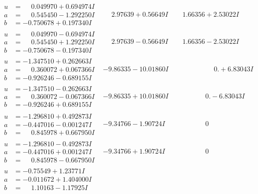 \documentclass[1p]{elsarticle_modified}
\theoremstyle{definition}
\begin{document}
$$\begin{array}{c|c|c}
\begin{aligned}
u &= \phantom{-}0.049970 + 0.694974 I \\
a &= \phantom{-}0.545450 - 1.292250 I \\
b &= -0.750678 + 0.197340 I\end{aligned}
 & \phantom{-}2.97639 + 0.56649 I & \phantom{-}1.66356 + 2.53022 I \\ \hline\begin{aligned}
u &= \phantom{-}0.049970 - 0.694974 I \\
a &= \phantom{-}0.545450 + 1.292250 I \\
b &= -0.750678 - 0.197340 I\end{aligned}
 & \phantom{-}2.97639 - 0.56649 I & \phantom{-}1.66356 - 2.53022 I \\ \hline\begin{aligned}
u &= -1.347510 + 0.262663 I \\
a &= \phantom{-}0.360072 + 0.067366 I \\
b &= -0.926246 - 0.689155 I\end{aligned}
 & -9.86335 - 10.01860 I & \phantom{-0.000000 -}0. + 6.83043 I \\ \hline\begin{aligned}
u &= -1.347510 - 0.262663 I \\
a &= \phantom{-}0.360072 - 0.067366 I \\
b &= -0.926246 + 0.689155 I\end{aligned}
 & -9.86335 + 10.01860 I & \phantom{-0.000000 } 0. - 6.83043 I \\ \hline\begin{aligned}
u &= -1.296810 + 0.492873 I \\
a &= -0.447016 - 0.001247 I \\
b &= \phantom{-}0.845978 + 0.667950 I\end{aligned}
 & -9.34766 - 1.90724 I & \phantom{-0.000000 } 0 \\ \hline\begin{aligned}
u &= -1.296810 - 0.492873 I \\
a &= -0.447016 + 0.001247 I \\
b &= \phantom{-}0.845978 - 0.667950 I\end{aligned}
 & -9.34766 + 1.90724 I & \phantom{-0.000000 } 0 \\ \hline\begin{aligned}
u &= -0.75549 + 1.23771 I \\
a &= -0.011672 + 1.404000 I \\
b &= \phantom{-}1.10163 - 1.17925 I\end{aligned}

\end{array}$$
\end{document}
